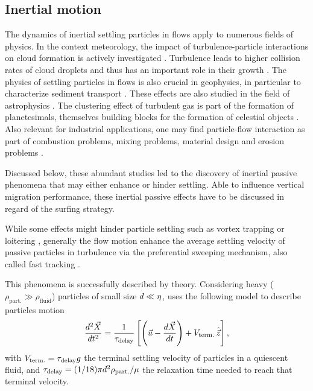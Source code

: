 \subsection{Inertial motion}\label{sec:passive_processes_inertial_effects}

The dynamics of inertial settling particles in flows apply to numerous fields of physics.
In the context meteorology, the impact of turbulence-particle interactions on cloud formation is actively investigated \citep{vaillancourt2000review}.
Turbulence leads to higher collision rates of cloud droplets and thus has an important role in their growth \citep{devenish2012droplet}.
The physics of settling particles in flows is also crucial in geophysics, in particular to characterize sediment transport \citep{kok2012physics, wallwork2022review}. 
These effects are also studied in the field of astrophysics \citep{volk1980collisions}.
The clustering effect of turbulent gas is part of the formation of planetesimals, themselves building blocks for the formation of celestial objects \citep{volk1980collisions, johansen2014multifaceted, hartlep2020cascade}.
Also relevant for industrial applications, one may find particle-flow interaction as part of combustion problems, mixing problems, material design and erosion problems \citep{balachandar2010turbulent, silva2015settling, gustavsson2016statistical}.

Discussed below, these abundant studies led to the discovery of inertial passive phenomena that may either enhance or hinder settling.
Able to influence vertical migration performance, these inertial passive effects have to be discussed in regard of the surfing strategy.

While some effects might hinder particle settling such as vortex trapping \citep{tooby1977motion} or loitering \citep{nielsen1993turbulence}, generally the flow motion enhance the average settling velocity of passive particles in turbulence via the preferential sweeping mechanism, also called fast tracking \citep{nielsen1993turbulence}.

This phenomena is successfully described by \citet{maxey1986gravitational} theory.
Considering heavy ($\rho_{\mathrm{part.}} \gg \rho_{\mathrm{fluid}}$) particles of small size $d \ll \eta$, \citet{maxey1986gravitational} uses the following model to describe particles motion
\begin{equation}\label{eq:inertial_motion}
	\frac{d^2 \vec{X}}{dt^2} = \frac{1}{\tau_{\mathrm{delay}}} \left[ \left(\vec{u} - \frac{d \vec{X}}{dt} \right) + V_{\mathrm{term.}} \, \hat{\vec{z}} \right],
\end{equation}
with $V_{\mathrm{term.}} = \tau_{\mathrm{delay}} g$ the terminal settling velocity of particles in a quiescent fluid, and $\tau_{\mathrm{delay}} = (1/18) \pi d^2 \rho_{\mathrm{part.}} / \mu$ the relaxation time needed to reach that terminal velocity.

